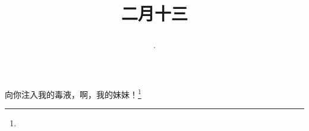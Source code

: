 \title{\date[d=22,m=3,y=2024][year:cn-y,年,month:cn,day:cn,日,·,weekday]·二月十三 }
向你注入我的毒液，啊，我的妹妹！\footnote{ }

